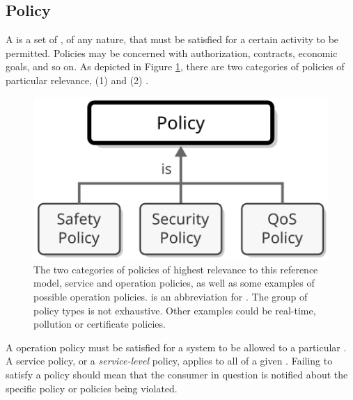 \newpage

\subsection{Policy}
\label{sec:concepts:policy}

A  is a set of , of any nature, that must be satisfied for a certain activity to be permitted.
Policies may be concerned with authorization, contracts, economic goals, and so on.
As depicted in Figure \ref{fig:policy}, there are two categories of policies of particular relevance, (1)  and (2) .

\begin{figure}[ht!]
  \centering
  \includegraphics[scale=0.9]{figures/policy}
  \caption{
    The two categories of policies of highest relevance to this reference model, service and operation policies, as well as some examples of possible operation policies.
     is an abbreviation for .
    The group of policy types is not exhaustive.
    Other examples could be real-time, pollution or certificate policies.
  }
  \label{fig:policy}
\end{figure}

A operation policy must be satisfied for a system to be allowed to  a particular .
A service policy, or a \textit{service-level} policy, applies to all  of a given .
Failing to satisfy a policy should mean that the consumer in question is notified about the specific policy or policies being violated.

